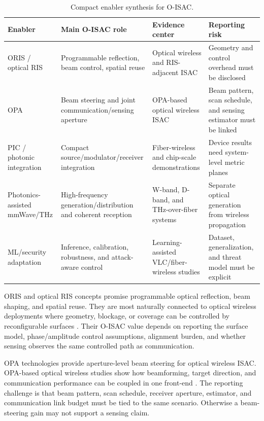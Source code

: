 \documentclass[letterpaper,journal]{IEEEtran}
\begin{document}
\begin{table}[!t]
    \caption{Compact enabler synthesis for O-ISAC.}
    \label{tab:vi_a_enablers}
    \centering
    \scriptsize
    \setlength{\tabcolsep}{2.8pt}
    \renewcommand{\arraystretch}{1.08}
    \begin{tabularx}{\textwidth}{@{}p{2.15cm}p{2.65cm}p{2.3cm}X@{}}
        \toprule
        Enabler & Main O-ISAC role & Evidence center & Reporting risk \\
        \midrule
        ORIS / optical RIS & Programmable reflection, beam control, spatial reuse & Optical wireless and RIS-adjacent ISAC \cite{O_ISAC_163} & Geometry and control overhead must be disclosed \\
        OPA & Beam steering and joint communication/sensing aperture & OPA-based optical wireless ISAC \cite{O_ISAC_061,O_ISAC_091} & Beam pattern, scan schedule, and sensing estimator must be linked \\
        PIC / photonic integration & Compact source/modulator/receiver integration & Fiber-wireless and chip-scale demonstrations \cite{O_ISAC_036,O_ISAC_045} & Device results need system-level metric planes \\
        Photonics-assisted mmWave/THz & High-frequency generation/distribution and coherent reception & W-band, D-band, and THz-over-fiber systems \cite{O_ISAC_029,O_ISAC_070} & Separate optical generation from wireless propagation \\
        ML/security adaptation & Inference, calibration, robustness, and attack-aware control & Learning-assisted VLC/fiber-wireless studies \cite{O_ISAC_039,O_ISAC_242} & Dataset, generalization, and threat model must be explicit \\
        \bottomrule
    \end{tabularx}
\end{table}

ORIS and optical RIS concepts promise programmable optical reflection, beam shaping, and spatial reuse. They are most naturally connected to optical wireless deployments where geometry, blockage, or coverage can be controlled by reconfigurable surfaces \cite{O_ISAC_112,O_ISAC_145,O_ISAC_156,O_ISAC_163,O_ISAC_200}. Their O-ISAC value depends on reporting the surface model, phase/amplitude control assumptions, alignment burden, and whether sensing observes the same controlled path as communication.

OPA technologies provide aperture-level beam steering for optical wireless ISAC. OPA-based optical wireless studies show how beamforming, target direction, and communication performance can be coupled in one front-end \cite{O_ISAC_008,O_ISAC_061,O_ISAC_091,O_ISAC_120}. The reporting challenge is that beam pattern, scan schedule, receiver aperture, estimator, and communication link budget must be tied to the same scenario. Otherwise a beam-steering gain may not support a sensing claim.
\end{document}
